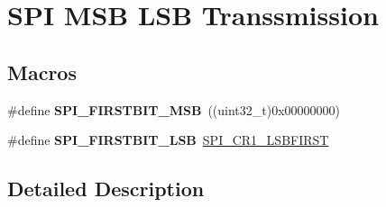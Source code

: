 \hypertarget{group___s_p_i___m_s_b___l_s_b__transmission}{}\section{S\+PI M\+SB L\+SB Transsmission}
\label{group___s_p_i___m_s_b___l_s_b__transmission}
\subsection*{Macros}
\begin{DoxyCompactItemize}
\item 
\#define {\bfseries S\+P\+I\+\_\+\+F\+I\+R\+S\+T\+B\+I\+T\+\_\+\+M\+SB}~((uint32\+\_\+t)0x00000000)\hypertarget{group___s_p_i___m_s_b___l_s_b__transmission_ga2280ac1a6ed587b516419b5df6a8ea55}{}\label{group___s_p_i___m_s_b___l_s_b__transmission_ga2280ac1a6ed587b516419b5df6a8ea55}

\item 
\#define {\bfseries S\+P\+I\+\_\+\+F\+I\+R\+S\+T\+B\+I\+T\+\_\+\+L\+SB}~\hyperlink{group___peripheral___registers___bits___definition_gab929e9d5ddbb66f229c501ab18d0e6e8}{S\+P\+I\+\_\+\+C\+R1\+\_\+\+L\+S\+B\+F\+I\+R\+ST}\hypertarget{group___s_p_i___m_s_b___l_s_b__transmission_ga8b608690a1adf9df40f271c228a479a3}{}\label{group___s_p_i___m_s_b___l_s_b__transmission_ga8b608690a1adf9df40f271c228a479a3}

\end{DoxyCompactItemize}


\subsection{Detailed Description}
